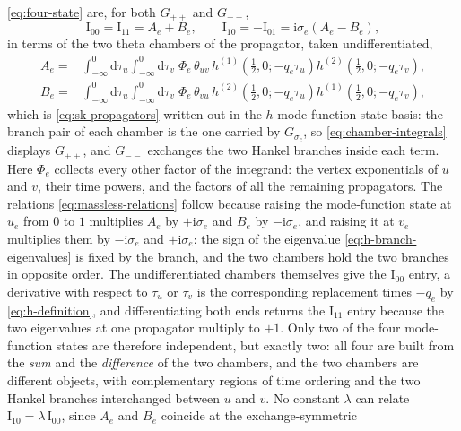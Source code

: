 \documentclass[11pt,a4paper]{article}
\numberwithin{table}{section}
\newcommand{\dd}{\mathrm d}
\newcommand{\ii}{\mathrm i}
\begin{document}
\eqref{eq:four-state} are, for both $G_{++}$ and $G_{--}$,
\begin{equation}
  \text{I}_{00}=\text{I}_{11}=A_e+B_e,
  \qquad
  \text{I}_{10}=-\text{I}_{01}=\ii\sigma_e\left(A_e-B_e\right),
  \label{eq:massless-relations}
\end{equation}
in terms of the two theta chambers of the propagator, taken undifferentiated,
\begin{equation}
  \begin{aligned}
  A_e={}&\int_{-\infty}^{0}\!\!\dd\tau_u\!\int_{-\infty}^{0}\!\!\dd\tau_v\;\Phi_e\,\theta_{uv}\,
  h^{(1)}\!\left(\tfrac12,0;-q_e\tau_u\right)h^{(2)}\!\left(\tfrac12,0;-q_e\tau_v\right),\\
  B_e={}&\int_{-\infty}^{0}\!\!\dd\tau_u\!\int_{-\infty}^{0}\!\!\dd\tau_v\;\Phi_e\,\theta_{vu}\,
  h^{(2)}\!\left(\tfrac12,0;-q_e\tau_u\right)h^{(1)}\!\left(\tfrac12,0;-q_e\tau_v\right),
  \end{aligned}
  \label{eq:chamber-integrals}
\end{equation}
which is \eqref{eq:sk-propagators} written out in the $h$ mode-function state basis: the branch pair
of each chamber is the one carried by $G_{\sigma_e}$, so \eqref{eq:chamber-integrals} displays
$G_{++}$, and $G_{--}$ exchanges the two Hankel branches inside each term. Here $\Phi_e$ collects
every other factor of the integrand: the vertex exponentials of $u$ and $v$, their time powers, and
the factors of all the remaining propagators. The relations \eqref{eq:massless-relations} follow
because raising the
mode-function state at $u_e$ from $0$ to $1$ multiplies $A_e$ by $+\ii\sigma_e$ and $B_e$ by
$-\ii\sigma_e$, and raising it at $v_e$ multiplies them by $-\ii\sigma_e$ and $+\ii\sigma_e$: the sign
of the eigenvalue \eqref{eq:h-branch-eigenvalues} is fixed by the branch, and the two chambers hold
the two branches in opposite order. The undifferentiated chambers themselves give the
$\text{I}_{00}$ entry, a derivative with respect to $\tau_u$ or $\tau_v$ is the corresponding
replacement times $-q_e$ by \eqref{eq:h-definition}, and differentiating both ends returns the
$\text{I}_{11}$ entry because the two eigenvalues at one propagator multiply to $+1$.
Only two of the four mode-function states are therefore independent, but exactly
two: all four are built from the \emph{sum} and the \emph{difference} of the two chambers, and the two
chambers are different objects, with complementary regions of time ordering and the two Hankel
branches interchanged between $u$ and $v$. No constant $\lambda$ can relate
$\text{I}_{10}=\lambda\,\text{I}_{00}$, since $A_e$ and $B_e$ coincide at the exchange-symmetric
\end{document}
